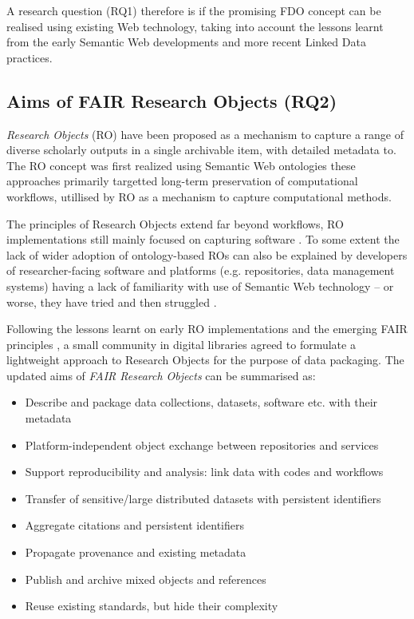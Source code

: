A research question (RQ1) therefore is if the promising FDO concept can be realised using existing Web technology, taking into account the lessons learnt from the early Semantic Web developments and more recent Linked Data practices. 


\subsection{Aims of FAIR Research Objects (RQ2)}

\emph{Research Objects} (RO) \cite{Bechhofer 2013} have been proposed as a mechanism to capture a range of diverse scholarly outputs in a single archivable item, with detailed metadata to. The RO concept was first realized using Semantic Web ontologies \cite{ch5-92,Belhajjame 2015} these approaches primarily targetted long-term preservation of computational workflows, utillised by RO as a mechanism to capture computational methods.

The principles of Research Objects extend far beyond workflows, RO implementations still mainly focused on capturing software \cite{goble-ro2018}. To some extent the lack of wider adoption of ontology-based ROs can also be explained by developers of researcher-facing software and platforms (e.g. repositories, data management systems) having a lack of familiarity with use of Semantic Web technology -- or worse, they have tried and then struggled \cite{carrieroLandscapeOntologyReuse2020a,Tudorache 2020}.

Following the lessons learnt on early RO implementations and the emerging FAIR principles \cite{Wilkinson 2016,Jacobsen 2020}, a small community in digital libraries agreed to formulate a lightweight approach to Research Objects \cite{Sefton 2018,10.5281/zenodo.3337883} for the purpose of data packaging. The updated aims of \emph{FAIR Research Objects} can be summarised as:
 
\begin{itemize}
    \item Describe and package data collections, datasets, software etc. with their metadata
    \item Platform-independent object exchange between repositories and services
    \item Support reproducibility and analysis: link data with codes and workflows
    \item Transfer of sensitive/large distributed datasets with persistent identifiers
    \item Aggregate citations and persistent identifiers
    \item Propagate provenance and existing metadata
    \item Publish and archive mixed objects and references
    \item Reuse existing standards, but hide their complexity
\end{itemize}

